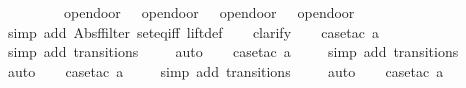 \begin{isabellebody}
\ \ \ \ \ \ \ {\isacharbraceleft}{\isacharbar}{\isacharparenleft}{\isacharparenleft}{}{\isacharcomma}\ {}{\isacharparenright}{\isacharcomma}\ opendoor{}{\isacharparenright}{\isacharcomma}\ {\isacharparenleft}{\isacharparenleft}{}{\isacharcomma}\ {}{\isacharparenright}{\isacharcomma}\ opendoor{}{\isacharparenright}{\isacharcomma}\ {\isacharparenleft}{\isacharparenleft}{}{\isacharcomma}\ {}{\isacharparenright}{\isacharcomma}\ opendoor{}{\isacharparenright}{\isacharcomma}\ {\isacharparenleft}{\isacharparenleft}{}{\isacharcomma}\ {}{\isacharparenright}{\isacharcomma}\ opendoor{}{\isacharparenright}{\isacharbar}{\isacharbraceright}{\isachardoublequoteclose}\isanewline
%
\isadelimproof
\ \ %
\endisadelimproof
%
\isatagproof
{}\isamarkupfalse%
\ {\isacharparenleft}simp\ add{\isacharcolon}\ Abs{\isacharunderscore}ffilter\ set{\isacharunderscore}eq{\isacharunderscore}iff\ lift{\isacharunderscore}def{\isacharparenright}\isanewline
\ \ \isamarkupfalse%
\ clarify\isanewline
\ \ \isamarkupfalse%
\ {\isacharparenleft}case{\isacharunderscore}tac\ {\isachardoublequoteopen}a{\isacharequal}{}{\isachardoublequoteclose}{\isacharparenright}\isanewline
\ \ \ \isamarkupfalse%
\ {\isacharparenleft}simp\ add{\isacharcolon}\ transitions{\isacharparenright}\isanewline
\ \ \ \isamarkupfalse%
\ auto{\isacharbrackleft}{}{\isacharbrackright}\isanewline
\ \ \isamarkupfalse%
\ {\isacharparenleft}case{\isacharunderscore}tac\ {\isachardoublequoteopen}a{\isacharequal}{}{\isachardoublequoteclose}{\isacharparenright}\isanewline
\ \ \ \isamarkupfalse%
\ {\isacharparenleft}simp\ add{\isacharcolon}\ transitions{\isacharparenright}\isanewline
\ \ \ \isamarkupfalse%
\ auto{\isacharbrackleft}{}{\isacharbrackright}\isanewline
\ \ \isamarkupfalse%
\ {\isacharparenleft}case{\isacharunderscore}tac\ {\isachardoublequoteopen}a{\isacharequal}{}{\isachardoublequoteclose}{\isacharparenright}\isanewline
\ \ \ \isamarkupfalse%
\ {\isacharparenleft}simp\ add{\isacharcolon}\ transitions{\isacharparenright}\isanewline
\ \ \ \isamarkupfalse%
\ auto{\isacharbrackleft}{}{\isacharbrackright}\isanewline
\ \ \isamarkupfalse%
\ {\isacharparenleft}case{\isacharunderscore}tac\ {\isachardoublequoteopen}a{\isacharequal}{}{\isachardoublequoteclose}{\isacharparenright}\isanewline

\end{isabellebody}
